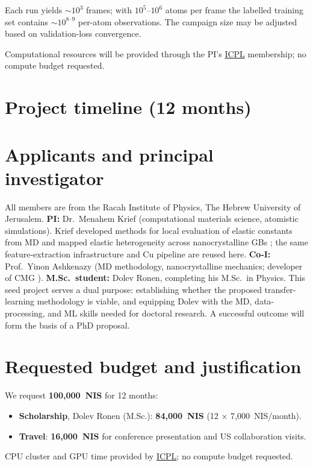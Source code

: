 \documentclass[11pt]{article}
\begin{document}
\noindent Each run yields ${\sim}10^3$ frames; with $10^5$--$10^6$ atoms per frame the labelled training set contains ${\sim}10^{8\text{--}9}$ per-atom observations. The campaign size may be adjusted based on validation-loss convergence.

\noindent Computational resources will be provided through the PI's \href{http://icpl.huji.ac.il}{ICPL} membership; no compute budget requested.

\section*{Project timeline (12 months)}

\noindent{}

\section*{Applicants and principal investigator}
All members are from the Racah Institute of Physics, The Hebrew University of Jerusalem.
\textbf{PI:} Dr.\ Menahem Krief (computational materials science, atomistic simulations). Krief developed methods for local evaluation of elastic constants from MD \cite{Krief2021} and mapped elastic heterogeneity across nanocrystalline GBs \cite{Krief2024}; the same feature-extraction infrastructure and Cu pipeline are reused here.
\textbf{Co-I:} Prof.\ Yinon Ashkenazy (MD methodology, nanocrystalline mechanics; developer of CMG \cite{Firman2024}).
\textbf{M.Sc.\ student:} Dolev Ronen, completing his M.Sc.\ in Physics.
This seed project serves a dual purpose: establishing whether the proposed transfer-learning methodology is viable, and equipping Dolev with the MD, data-processing, and ML skills needed for doctoral research. A successful outcome will form the basis of a PhD proposal.

\section*{Requested budget and justification}
We request \textbf{100,000~NIS} for 12 months:
\begin{itemize}
    \item \textbf{Scholarship}, Dolev Ronen (M.Sc.): \textbf{84,000~NIS} (12 $\times$ 7,000~NIS/month).
    \item \textbf{Travel}: \textbf{16,000~NIS} for conference presentation and US collaboration visits.
\end{itemize}
CPU cluster and GPU time provided by \href{http://icpl.huji.ac.il}{ICPL}; no compute budget requested.
\end{document}
